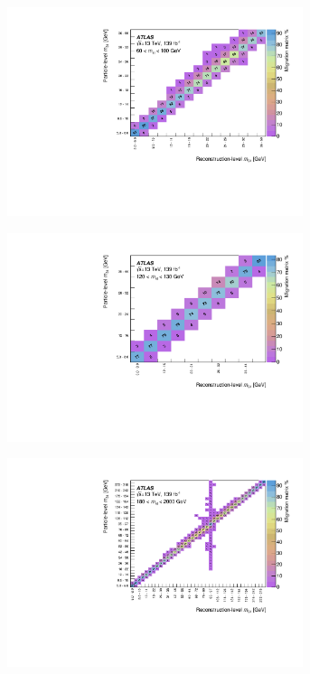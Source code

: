 \begin{figure}[htb]
  \centering
  \begin{subfigure}{.49\textwidth}\centering\includegraphics[width = 0.95\textwidth]{Figures/m4l/UnfoldingStudies/v014_matrices/m34_m4l60-100Matrix.pdf}\end{subfigure}
  \begin{subfigure}{.49\textwidth}\centering\includegraphics[width = 0.95\textwidth]{Figures/m4l/UnfoldingStudies/v014_matrices/m34_m4l120-130Matrix.pdf}\end{subfigure}
  \begin{subfigure}{.49\textwidth}\centering\includegraphics[width = 0.95\textwidth]{Figures/m4l/UnfoldingStudies/v014_matrices/m34_m4l180-2000Matrix.pdf}\end{subfigure}

\end{figure}
